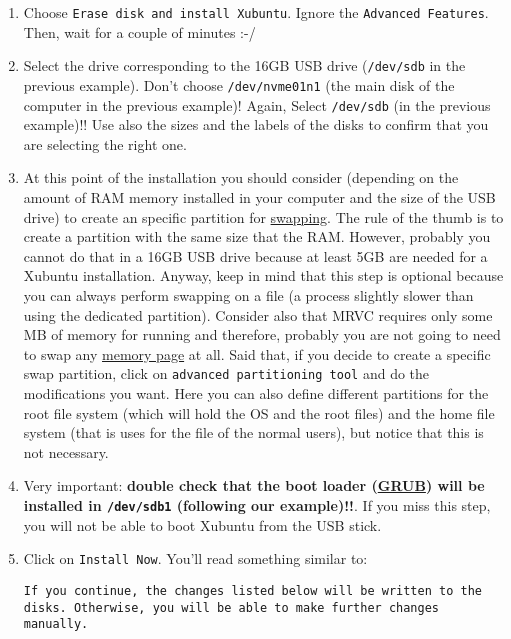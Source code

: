 \begin{enumerate}
\item Choose \texttt{Erase disk and install Xubuntu}. Ignore the
  \verb|Advanced Features|. Then, wait for a couple of minutes :-/

\item Select the drive corresponding to the 16GB USB drive
  (\texttt{/dev/sdb} in the previous example). Don't choose
  \texttt{/dev/nvme01n1} (the main disk of the computer in the
  previous example)! Again, Select \texttt{/dev/sdb} (in the previous
  example)!! Use also the sizes and the labels of the disks to confirm
  that you are selecting the right one.

\item At this point of the installation you should consider (depending
  on the amount of RAM memory installed in your computer and the size
  of the USB drive) to create an specific partition for
  \href{https://en.wikipedia.org/wiki/Swapping}{swapping}. The rule of
  the thumb is to create a partition with the same size that the
  RAM. However, probably you cannot do that in a 16GB USB drive because
  at least 5GB are needed for a Xubuntu installation. Anyway, keep in
  mind that this step is optional because you can always perform
  swapping on a file (a process slightly slower than using the
  dedicated partition). Consider also that MRVC requires only some
  MB of memory for running and therefore, probably you are not going
  to need to swap any
  \href{https://en.wikipedia.org/wiki/Page_(computer_memory)}{memory
    page} at all. Said that, if you decide to create a specific swap
  partition, click on \verb|advanced partitioning tool| and do the
  modifications you want. Here you can also define different
  partitions for the root file system (which will hold the OS and the
  root files) and the home file system (that is uses for the file of
  the normal users), but notice that this is not necessary.

\item Very important: \textbf{double check that the boot loader
  (\href{https://www.gnu.org/software/grub/}{GRUB}) will be installed
  in \texttt{/dev/sdb1} (following our example)!!}. If you miss this
  step, you will not be able to boot Xubuntu from the USB stick.

\item Click on \verb|Install Now|. You'll read something similar to:

\begin{verbatim}
If you continue, the changes listed below will be written to the disks. Otherwise, you will be able to make further changes manually.


\end{verbatim}
\end{enumerate}
